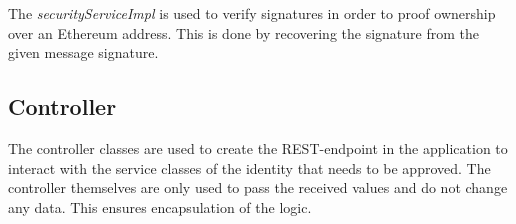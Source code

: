 The \textit{securityServiceImpl} is used to verify signatures in order to proof ownership over an Ethereum address. This is done by recovering the signature from the given message signature. 


\subsection{Controller}\label{sec:controller}
The controller classes are used to create the REST-endpoint in the application to interact with the service classes of the identity that needs to be approved. The controller themselves are only used to pass the received values and do not change any data. This ensures encapsulation of the logic.

